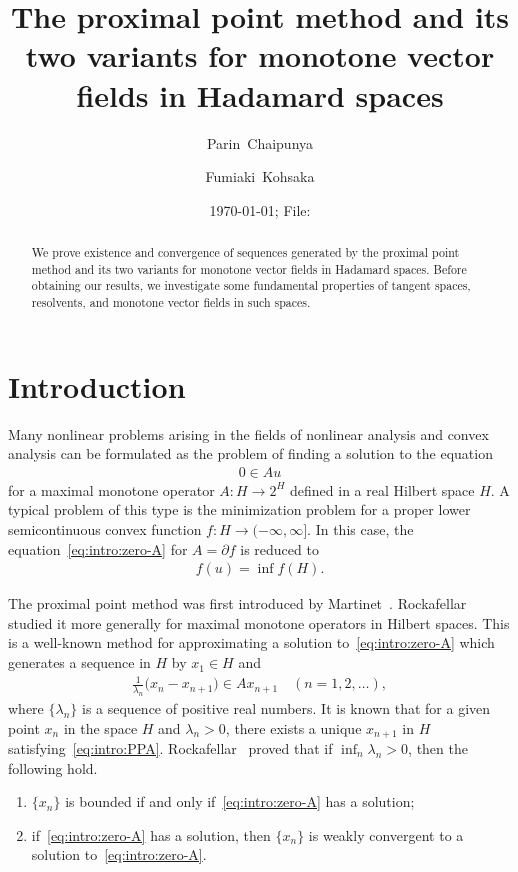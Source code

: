\documentclass[draft]{amsart}
\title[Finding zero points of monotone vector fields] 
{The proximal point method and its two variants for monotone vector fields in Hadamard spaces}
\author[P.~Chaipunya]{Parin~Chaipunya}
\author[F.~Kohsaka]{Fumiaki~Kohsaka}
\date{\today; File: \jobname}
\numberwithin{equation}{section}
\theoremstyle{plain}
\theoremstyle{definition}
\theoremstyle{remark}
\begin{document}
%
\begin{abstract}
 We prove existence and convergence of 
 sequences generated by the proximal point method and its two variants 
 for monotone vector fields in Hadamard spaces. 
 Before obtaining our results, we investigate some fundamental properties 
 of tangent spaces, resolvents, and monotone vector fields in such spaces. 
\end{abstract}
%
\maketitle

\section{Introduction}

Many nonlinear problems arising in the fields of nonlinear analysis and 
convex analysis can be formulated as the problem of finding a solution 
to the equation 
\begin{align}\label{eq:intro:zero-A}
 0\in Au
\end{align}
for a maximal monotone operator $A\colon H\to 2^H$ defined in a real Hilbert space $H$. 
A typical problem of this type is the minimization problem for  
a proper lower semicontinuous convex function 
$f\colon H\to (-\infty, \infty]$. 
In this case, the equation~\eqref{eq:intro:zero-A} for $A=\partial f$ 
is reduced to 
\begin{align}\label{eq:intro:zero-partial-f}
 f(u)=\inf f(H). 
\end{align}

The proximal point method was first introduced by Martinet~\cite{MR0298899}. 
Rockafellar~\cite{MR0410483} studied it more generally for maximal monotone 
operators in Hilbert spaces. This is a well-known method for approximating 
a solution to~\eqref{eq:intro:zero-A} which generates a sequence in $H$ by 
$x_1\in H$ and 
\begin{align}\label{eq:intro:PPA}
 \frac{1}{\lambda_n} \bigl(x_{n} - x_{n+1}\bigr) \in Ax_{n+1} \quad (n=1,2,\dots), 
\end{align}
where $\{\lambda_n\}$ is a sequence of positive real numbers. 
It is known that for a given point $x_n$ in the space $H$ and 
$\lambda_n>0$, there 
exists a unique $x_{n+1}$ in $H$ satisfying~\eqref{eq:intro:PPA}. 
Rockafellar~\cite{MR0410483} proved that if $\inf_n\lambda_n >0$, then 
the following hold. 
\begin{enumerate}
 \item[(i)] $\{x_n\}$ is bounded if and only if~\eqref{eq:intro:zero-A} has a solution; 
 \item[(ii)] if~\eqref{eq:intro:zero-A} has a solution, then $\{x_n\}$ is weakly convergent 
 to a solution to~\eqref{eq:intro:zero-A}. 
\end{enumerate}
\end{document}
